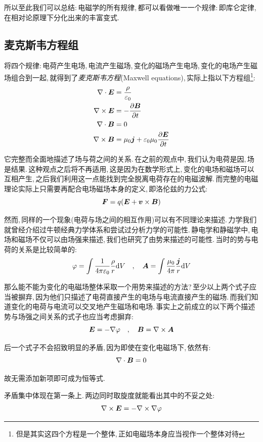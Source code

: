 所以至此我们可以总结:\,电磁学的所有规律,\,都可以看做唯一一个规律:\,即库仑定律,\,在相对论原理下分化出来的丰富变式.


\subsection{麦克斯韦方程组}

将四个规律:\,电荷产生电场,\,电流产生磁场,\,变化的磁场产生电场,\,变化的电场产生磁场组合到一起,\,就得到了\emph{麦克斯韦方程}(Maxwell equations),\,实际上指以下方程组\footnote{但是其实这四个方程是一个整体,\,正如电磁场本身应当视作一个整体对待}:
\begin{align*}
\nabla\cdot \boldsymbol{E} &=  \frac{\rho }{\varepsilon_0}\\
\nabla\times \boldsymbol{E} &=   -\frac{\partial \boldsymbol{B}}{\partial t} \\
\nabla\cdot \boldsymbol{B} &=  0 \\
\nabla\times\boldsymbol{B} &=\mu_0\boldsymbol{j}  +  \varepsilon_0\mu_0\frac{\partial \boldsymbol{E}}{\partial t}
\end{align*}

它完整而全面地描述了场与荷之间的关系.\,在之前的观点中,\,我们认为电荷是因,\,场是结果.\,这种观点之后将不再适用,\,这是因为在数学形式上,\,变化的电场和磁场可以互相产生,\,之后我们利用这一点能找到完全脱离电荷存在的电磁波解.\,而完整的电磁理论实际上只需要再配合电场磁场本身的定义,\,即洛伦兹的力公式:
\[\boldsymbol{F}=q(\boldsymbol{E}+\boldsymbol{v}\times \boldsymbol{B})\]

然而,\,同样的一个现象(电荷与场之间的相互作用)可以有不同理论来描述.\,力学我们就曾经介绍过牛顿经典力学体系和尝试过分析力学的可能性.\,静电学和静磁学中,\,电场和磁场不仅可以由场强来描述,\,我们也研究了由势来描述的可能性.\,当时的势与电荷的关系是比较简单的:
\[\varphi=\int\frac{1}{4\pi\varepsilon_0} \frac{\rho}{r}\textrm{d} V \quad ,\quad \boldsymbol{A}=\int \frac{\mu_0}{4\pi} \frac{\boldsymbol{j}}{r}\textrm{d} V\]

那么能不能为变化的电磁场整体采取一个用势来描述的方法?\,至少以上两个式子应当被摒弃,\,因为他们只描述了电荷直接产生的电场与电流直接产生的磁场.\,而我们知道变化的电荷与电流可以交叉地产生磁场和电场.\,事实上之前成立的以下两个描述势与场强之间关系的式子也应当考虑摒弃:
\[\boldsymbol{E}=-\nabla \varphi\quad,\quad \boldsymbol{B}=\nabla \times \boldsymbol{A} \]

后一个式子不会招致明显的矛盾,\,因为即使在变化电磁场下,\,依然有:
\[\nabla\cdot \boldsymbol{B}=0\]

故无需添加新项即可成为恒等式.

矛盾集中体现在第一条上.\,两边同时取旋度就能看出其中的不妥之处:
\[\nabla \times \boldsymbol{E}=-\nabla \times\nabla \varphi\]

